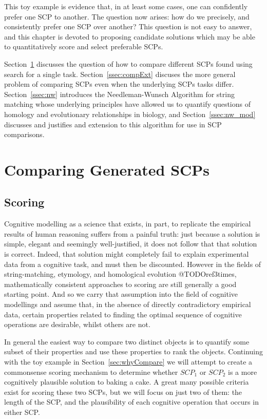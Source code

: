 This toy example is evidence that, in at least some cases, one can confidently prefer one SCP to another. The question now arises: how do we precisely, and consistently prefer one SCP over another? This question is not easy to answer, and this chapter is devoted to proposing candidate solutions which may be able to quantitatively score and select preferable SCPs.

Section~\ref{ssec:compGen} discusses the question of how to compare different SCPs found using search for a single task. Section~\ref{ssec:compExt} discuses the more general problem of comparing SCPs even when the underlying SCPs tasks differ. Section~\ref{ssec:nw} introduces the Needleman-Wunsch Algorithm for string matching whose underlying principles have allowed us to quantify questions of homology and evolutionary relationships in biology, and Section~\ref{ssec:nw_mod} discusses and justifies and extension to this algorithm for use in SCP comparisons.

\section{Comparing Generated SCPs} \label{ssec:compGen}
\subsection{Scoring}
Cognitive modelling as a science that exists, in part, to replicate the empirical results of human reasoning suffers from a painful truth: just because a solution is simple, elegant and seemingly well-justified, it does not follow that that solution is correct. Indeed, that solution might completely fail to explain experimental data from a cognitive task, and must then be discounted. However in the fields of string-matching, etymology, and homological evolution @TODOref3times, mathematically consistent approaches to scoring are still generally a good starting point. And so we carry that assumption into the field of cognitive modellings and assume that, in the absence of directly contradictory empirical data, certain properties related to finding the optimal sequence of cognitive operations are desirable, whilst others are not.

In general the easiest way to compare two distinct objects is to quantify some subset of their properties and use these properties to rank the objects. Continuing with the toy example in Section~\ref{sec:whyCompare} we will attempt to create a commonsense scoring mechanism to determine whether $SCP_1$ or $SCP_2$ is a more cognitively plausible solution to baking a cake. A great many possible criteria exist for scoring these two SCPs, but we will focus on just two of them: the length of the SCP, and the plausibility of each cognitive operation that occurs in either SCP.

